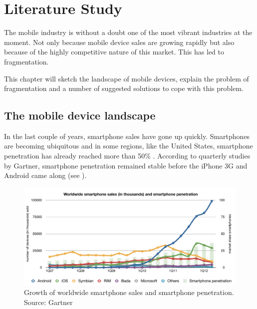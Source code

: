\chapter{Literature Study}
\label{chap:literature}

\npar The mobile industry is without a doubt one of the most vibrant industries at the moment. Not only because mobile device sales are growing rapidly but also because of the highly competitive nature of this market. This has led to fragmentation. 

\npar This chapter will sketch the landscape of mobile devices, explain the problem of fragmentation and a number of suggested solutions to cope with this problem.

\section{The mobile device landscape}

\npar In the last couple of years, smartphone sales have gone up quickly. Smartphones are becoming ubiquitous and in some regions, like the United States, smartphone penetration has already reached more than 50\% \cite{Nielsen:2012}. According to quarterly studies by Gartner, smartphone penetration remained stable before the iPhone 3G and Android came along (see ).

\begin{figure}[h!]
    \begin{center}
        \includegraphics[width=\textwidth]{figs/smartphone_sales.pdf}
        	\caption{
        	    	Growth of worldwide smartphone sales and smartphone penetration. Source: Gartner \citep{Gartner:08Q2,Gartner:08Q3,Gartner:08Q4,Gartner:10Q1,Gartner:10Q2,Gartner:10Q3,Gartner:10Q4,Gartner:11Q1,Gartner:11Q2,Gartner:11Q3,Gartner:11Q4,Gartner:12Q1,Gartner:12Q2}
        	}
        	\label{fig:smartphone_sales}
    \end{center}
\end{figure}

